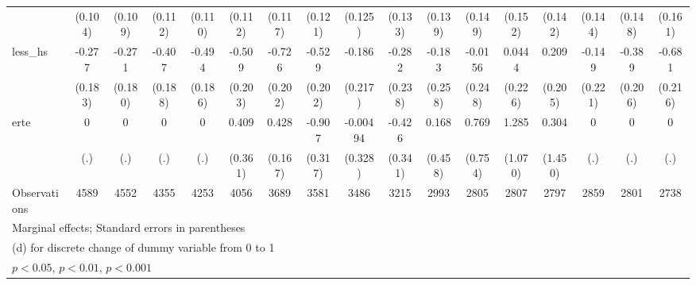 {\begin{tabular}{l*{16}{c}}
                    &     (0.104)         &     (0.109)         &     (0.112)         &     (0.110)         &     (0.112)         &     (0.117)         &     (0.121)         &     (0.125)         &     (0.133)         &     (0.139)         &     (0.149)         &     (0.152)         &     (0.142)         &     (0.144)         &     (0.148)         &     (0.161)         \\
[1em]
less\_hs             &      -0.277         &      -0.271         &      -0.407\sym{*}  &      -0.494\sym{**} &      -0.509\sym{*}  &      -0.726\sym{***}&      -0.529\sym{**} &      -0.186         &      -0.282         &      -0.183         &     -0.0156         &      0.0444         &       0.209         &      -0.149         &      -0.389         &      -0.681\sym{**} \\
                    &     (0.183)         &     (0.180)         &     (0.188)         &     (0.186)         &     (0.203)         &     (0.202)         &     (0.202)         &     (0.217)         &     (0.238)         &     (0.258)         &     (0.248)         &     (0.226)         &     (0.205)         &     (0.221)         &     (0.206)         &     (0.216)         \\
[1em]
erte                &           0         &           0         &           0         &           0         &       0.409         &       0.428\sym{*}  &      -0.907\sym{**} &    -0.00494         &      -0.426         &       0.168         &       0.769         &       1.285         &       0.304         &           0         &           0         &           0         \\
                    &         (.)         &         (.)         &         (.)         &         (.)         &     (0.361)         &     (0.167)         &     (0.317)         &     (0.328)         &     (0.341)         &     (0.458)         &     (0.754)         &     (1.070)         &     (1.450)         &         (.)         &         (.)         &         (.)         \\
\hline
Observations        &        4589         &        4552         &        4355         &        4253         &        4056         &        3689         &        3581         &        3486         &        3215         &        2993         &        2805         &        2807         &        2797         &        2859         &        2801         &        2738         \\
\hline\hline
\multicolumn{17}{l}{\footnotesize Marginal effects; Standard errors in parentheses}\\
\multicolumn{17}{l}{\footnotesize  (d) for discrete change of dummy variable from 0 to 1}\\
\multicolumn{17}{l}{\footnotesize \sym{*} \(p<0.05\), \sym{**} \(p<0.01\), \sym{***} \(p<0.001\)}\\
\end{tabular}
}
